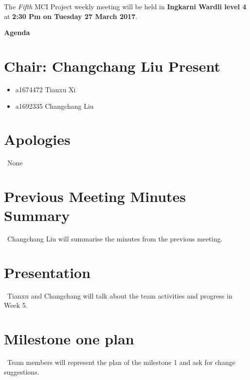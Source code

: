 \documentclass[11pt, a4paper]{article}
\begin{document}
\noindent The {\em Fifth} MCI Project weekly meeting will be held in {\bf Ingkarni Wardli level 4} at {\bf 2:30 Pm on Tuesday 27 March 2017}.


\vspace*{15pt}

\begin{center}
\huge \bf Agenda
\end{center}



\section*{Chair: Changchang Liu                    Present}
\begin{itemize}
	\item a1674472  Tianxu Xi
	\item a1692335 Changchang Liu
\end{itemize}

\section{Apologies}
\ None \\


\section{Previous Meeting Minutes Summary}
\ Changchang Liu will summarise the minutes from the previous meeting.


\section{Presentation}
\ Tianxu and Changchang will talk about the team activities and progress in Week 5. \\
\section{Milestone one plan}
\ Team members will  represent the plan of the milestone 1 and ask for change suggestions. \\
\end{document}

